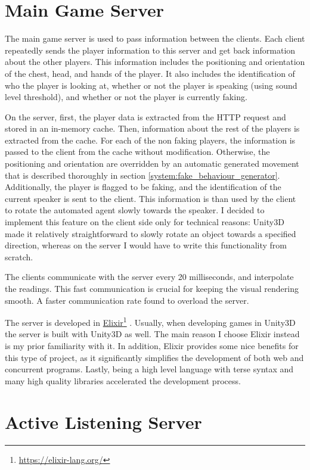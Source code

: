\documentclass[]{simple-thesis}
\newcommand\fnurl[2]{%
  \href{#2}{#1}\footnote{\url{#2}}%
}
\begin{document}
\section{Main Game Server}

The main game server is used to pass information between the clients.
Each client repeatedly sends the player information to this server and get back information about the other players.
This information includes the positioning and orientation of the chest, head, and hands of the player.
It also includes the identification of who the player is looking at, whether or not the player is speaking (using sound level threshold), and whether or not the player is currently faking.

On the server, first, the player data is extracted from the HTTP request and stored in an in-memory cache.
Then, information about the rest of the players is extracted from the cache.
For each of the non faking players, the information is passed to the client from the cache without modification.
Otherwise, the positioning and orientation are overridden by an automatic generated movement that is described thoroughly in section \ref{system:fake_behaviour_generator}.
Additionally, the player is flagged to be faking, and the identification of the current speaker is sent to the client.
This information is than used by the client to rotate the automated agent slowly towards the speaker.
I decided to implement this feature on the client side only for technical reasons:
Unity3D made it relatively straightforward to slowly rotate an object towards a specified direction, whereas on the server I would have to write this functionality from scratch.

The clients communicate with the server every 20 milliseconds, and interpolate the readings.
This fast communication is crucial for keeping the visual rendering smooth.
A faster communication rate found to overload the server.

The server is developed in \fnurl{Elixir}{https://elixir-lang.org/}.
Usually, when developing games in Unity3D the server is built with Unity3D as well.
The main reason I choose Elixir instead is my prior familiarity with it.
In addition, Elixir provides some nice benefits for this type of project, as it significantly simplifies the development of both web and concurrent programs.
Lastly, being a high level language with terse syntax and many high quality libraries accelerated the development process.

\section{Active Listening Server}\label{system:active_listening_server}
\end{document}
